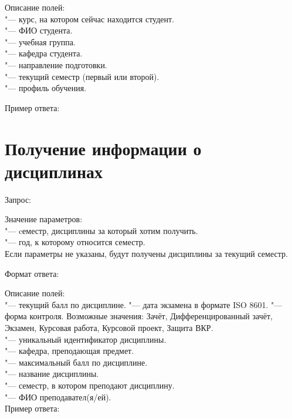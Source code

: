 Описание полей:\\
 "--- курс, на котором сейчас находится студент.\\
 "--- ФИО студента.\\
 "--- учебная группа.\\
 "--- кафедра студента.\\
 "--- направление подготовки.\\
 "--- текущий семестр (первый или второй).\\
 "--- профиль обучения.

Пример ответа:
\begin{listing}[H]
\end{listing}
\vspace{-0.75cm}

\section{Получение информации о дисциплинах}
\label{sec:dis}

Запрос: 

Значение параметров:\\
 "--- cеместр, дисциплины за который хотим получить.\\
 "--- год, к которому относится семестр.\\
Если параметры не указаны, будут получены дисциплины за текущий семестр.

Формат ответа:
\begin{listing}[H]
\end{listing}
\vspace{-0.75cm}

Описание полей:\\
 "--- текущий балл по дисциплине.
 "--- дата экзамена в формате  ISO 8601.
 "--- форма контроля.
Возможные значения: Зачёт, Дифференцированный зачёт, Экзамен, Курсовая работа, Курсовой проект, Защита ВКР.\\
 "--- уникальный идентификатор дисциплины.\\
 "--- кафедра, преподающая предмет.\\
 "--- максимальный балл по дисциплине.\\
 "--- название дисциплины.\\
 "--- семестр, в котором преподают дисциплину.\\
 "--- ФИО преподавател(я/ей).\\

Пример ответа:
\begin{listing}[H]
\end{listing}
\vspace{-0.75cm}
